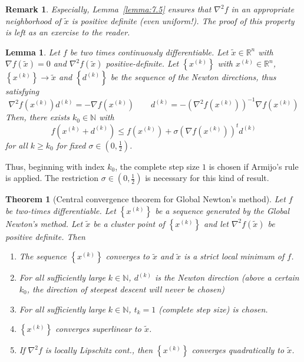 \documentclass[a4paper]{article}
\newcounter{lecref}[subsection]
\numberwithin{lecref}{subsection}
\newtheorem{theorem}[lecref]{Theorem}
\newtheorem{lemma}[lecref]{Lemma}
\newtheorem*{Remark}{Remark}
\newcommand{\Set}[1]{\left\{#1\right\}}
\begin{document}
\begin{Remark}
	Especially, Lemma~\ref{lemma:7.5} ensures that $\nabla^2 f$ in an appropriate neighborhood of $\tilde x$ is positive definite (even uniform!).
	The proof of this property is left as an exercise to the reader.
\end{Remark}

\begin{lemma}
	\label{lemma:7.6}
	Let $f$ be two times continuously differentiable. Let $\tilde x \in \mathbb R^n$ with $\nabla f(\tilde x) = 0$ and $\nabla^2 f(\tilde x)$ positive-definite.
	Let $\Set{x^{(k)}}$ with $x^{(k)} \in \mathbb R^n$, $\Set{x^{(k)}} \to \tilde x$ and $\Set{d^{(k)}}$ be the sequence of the Newton directions, thus satisfying
	\[ \nabla^2 f(x^{(k)}) d^{(k)} = -\nabla f(x^{(k)}) \qquad d^{(k)} = -\left(\nabla^2 f(x^{(k)})\right)^{-1} \nabla f(x^{(k)}) \]
	Then, there exists $k_0 \in \mathbb N$ with
	\[ f(x^{(k)} + d^{(k)}) \leq f(x^{(k)}) + \sigma \left(\nabla f(x^{(k)})\right)^t d^{(k)} \]
	for all $k \geq k_0$ for fixed $\sigma \in \left(0, \frac12\right)$.
\end{lemma}

Thus, beginning with index $k_0$, the complete step size $1$ is chosen if Armijo's rule is applied.
The restriction $\sigma \in \left(0, \frac12\right)$ is necessary for this kind of result.

\begin{theorem}[Central convergence theorem for Global Newton's method]
	\label{theorem:7.7}
	Let $f$ be two-times differentiable. Let $\Set{x^{(k)}}$ be a sequence generated by the Global Newton's method. Let $\tilde x$ be a cluster point of $\Set{x^{(k)}}$ and let $\nabla^2 f(\tilde x)$ be positive definite. Then
	\begin{enumerate}
		\item The sequence $\Set{x^{(k)}}$ converges to $\tilde x$ and $\tilde x$ is a strict local minimum of $f$.
		\item For all sufficiently large $k \in \mathbb N$, $d^{(k)}$ is the Newton direction (above a certain $k_0$, the direction of steepest descent will never be chosen)
		\item For all sufficiently large $k \in \mathbb N$, $t_k = 1$ (complete step size) is chosen.
		\item $\Set{x^{(k)}}$ converges superlinear to $\tilde x$.
		\item If $\nabla^2 f$ is locally Lipschitz cont., then $\Set{x^{(k)}}$ converges quadratically to $\tilde x$.
	\end{enumerate}
\end{theorem}
\end{document}
